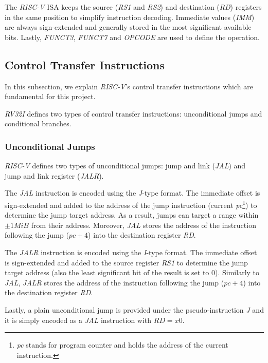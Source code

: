 The \textit{RISC-V} ISA keeps the source (\textit{RS1} and \textit{RS2}) and destination
(\textit{RD}) registers in the same position to simplify instruction decoding. Immediate
values (\textit{IMM}) are always sign-extended and generally stored in the most
significant available bits. Lastly, \textit{FUNCT3}, \textit{FUNCT7} and \textit{OPCODE}
are used to define the operation.

\subsection{Control Transfer Instructions}
\label{subsec:riscv_controltransfer}

In this subsection, we explain \textit{RISC-V}'s control transfer instructions which
are fundamental for this project.

\textit{RV32I} defines two types of control transfer instructions: unconditional
jumps and conditional branches.

\subsubsection{Unconditional Jumps}
\label{subsubsec:riscv_unconditionalj}

\textit{RISC-V} defines two types of unconditional jumps: jump and link (\textit{JAL})
and jump and link register (\textit{JALR}).

The \textit{JAL} instruction is encoded using the \textit{J}-type format. The immediate
offset is sign-extended and added to the address of the jump instruction (current
\textit{pc}\footnote{\textit{pc} stands for program counter and holds the address
of the current instruction.}) to determine the jump target address. As a result,
jumps can target a range within $\pm 1 MiB$ from their address. Moreover, \textit{JAL}
stores the address of the instruction following the jump ($\textit{pc}+ 4$) into
the destination register \textit{RD}.

The \textit{JALR} instruction is encoded using the \textit{I}-type format. The
immediate offset is sign-extended and added to the source register \textit{RS1} to
determine the jump target address (also the least significant bit of the result
is set to $0$). Similarly to \textit{JAL}, \textit{JALR} stores the address of the
instruction following the jump ($\textit{pc}+ 4$) into the destination register \textit{RD}.

Lastly, a plain unconditional jump is provided under the pseudo-instruction \textit{J}
and it is simply encoded as a \textit{JAL} instruction with $\textit{RD}= x0$.

